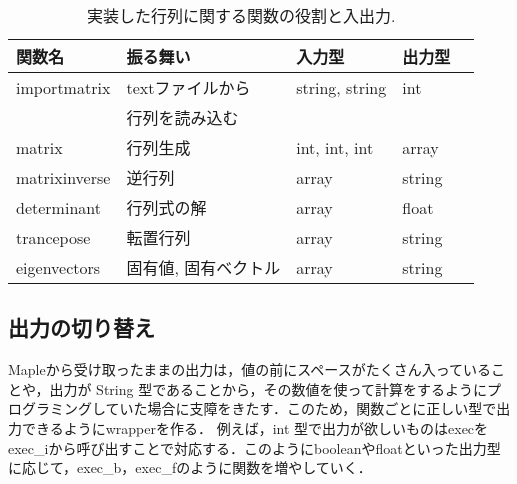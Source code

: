 \documentclass[10pt,a4j]{article}
\begin{document}
\begin{table}[htbp]\begin{center}
\caption{実装した行列に関する関数の役割と入出力.}
\label{table:two}
\begin{tabular}{lllll}
\hline
関数名  &振る舞い  &入力型  &出力型  \\ \hline
importmatrix  &textファイルから  &string, string  &int  \\
 &行列を読み込む  & \\
matrix  &行列生成  &int, int, int  &array  \\
matrixinverse  &逆行列  &array  &string  \\
determinant  &行列式の解  &array  &float  \\
trancepose  &転置行列  &array  &string  \\
eigenvectors  &固有値, 固有ベクトル  &array  &string  \\
\hline
\end{tabular}
\label{default}
\end{center}\end{table}

\newpage

\subsection{出力の切り替え}
Mapleから受け取ったままの出力は，値の前にスペースがたくさん入っていることや，出力が String 型であることから，その数値を使って計算をするようにプログラミングしていた場合に支障をきたす．このため，関数ごとに正しい型で出力できるようにwrapperを作る．
例えば，int 型で出力が欲しいものはexecをexec\_iから呼び出すことで対応する．このようにbooleanやfloatといった出力型に応じて，exec\_b，exec\_fのように関数を増やしていく．
\end{document}
